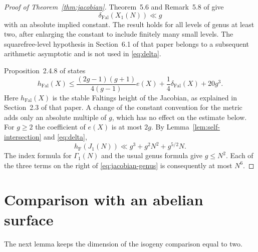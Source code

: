 \documentclass[11pt,a4paper]{article}
\theoremstyle{definition}
\newcommand{\hF}{h_{\mathrm F}}
\newcommand{\hFal}{h_{\mathrm{Fal}}}
\newcommand{\deltaFal}{\delta_{\mathrm{Fal}}}
\begin{document}
\begin{proof}[Proof of Theorem~\ref{thm:jacobian}]
Theorem~5.6 and Remark~5.8 of \cite{JorgensonKramer} give
\begin{equation}\label{eq:delta}
 \deltaFal(X_1(N))\ll g
\end{equation}
with an absolute implied constant. The result holds for all
levels of genus at least two, after enlarging the constant to
include finitely many small levels. The squarefree-level
hypothesis in Section~6.1 of that paper belongs to a subsequent
arithmetic asymptotic and is not used in \eqref{eq:delta}.

Proposition~2.4.8 of \cite{Javanpeykar} states
\[
 \hFal(X)\le
 \frac{(2g-1)(g+1)}{4(g-1)}e(X)
 +\frac14\deltaFal(X)+20g^3.
\]
Here $\hFal(X)$ is the stable Faltings height of the Jacobian,
as explained in Section~2.3 of that paper. A change of the
constant convention for the metric adds only an absolute
multiple of $g$, which has no effect on the estimate below.
For $g\ge2$ the coefficient of $e(X)$ is at most $2g$.
By Lemma~\ref{lem:self-intersection} and \eqref{eq:delta},
\begin{equation}\label{eq:jacobian-genus}
 \hF(J_1(N))\ll
 g^3+g^2N^2+g^{5/2}N.
\end{equation}
The index formula for $\Gamma_1(N)$ and the usual genus formula
give $g\le N^2$. Each of the three terms on the right of
\eqref{eq:jacobian-genus} is consequently at most $N^6$.
\end{proof}

\section{Comparison with an abelian surface}

The next lemma keeps the dimension of the isogeny comparison
equal to two.
\end{document}
